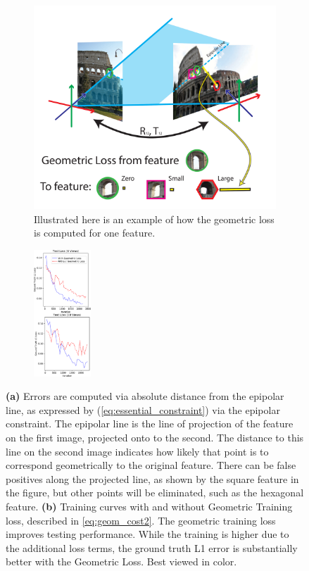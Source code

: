 \documentclass{article} %
\begin{document}
\begin{figure}[t]
\centering
\begin{subfigure}[b]{.60\linewidth}
  \centering
  \includegraphics[width=0.95\linewidth]{figures-GeometricConsistency-v2.pdf}
  \caption{Illustrated here is an example of how the geometric loss is computed for one feature.}
  \label{fig:1b}
  \label{fig:geoconsist}
\end{subfigure}
\begin{subfigure}[b]{.30\textwidth}
  \centering
  \includegraphics[height=180px]{figures-GeometricLoss.pdf}
  \caption{}
  \label{fig:3b}
  \label{fig:geomloss}
\end{subfigure}
\caption{
  \textbf{(a)} Errors are computed via absolute distance from the epipolar line, as expressed by (\ref{eq:essential_constraint}) via the epipolar constraint.
  The epipolar line is the line of projection of the feature on the first image, projected onto to the second.
  The distance to this line on the second image indicates how likely that point is to correspond geometrically to the original feature.
  There can be false positives along the projected line, as shown by the square feature in the figure, but other points will be eliminated, such as the hexagonal feature.
  \textbf{(b)} Training curves with and without Geometric Training loss, described in \ref{eq:geom_cost2}.
  The geometric training loss improves testing performance.
  While the training is higher due to the additional loss terms, the ground truth L1 error is substantially better with the Geometric Loss.
  Best viewed in color.
}
\label{fig:1}
\end{figure}
\end{document}
